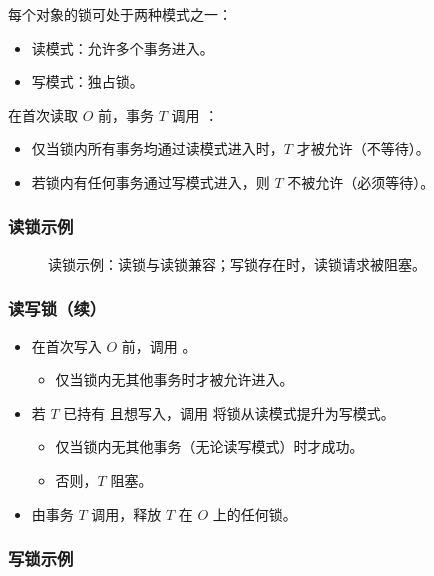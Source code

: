每个对象的锁可处于两种模式之一：

\begin{itemize}
  \item 读模式：允许多个事务进入。
  \item 写模式：独占锁。
\end{itemize}

在首次读取 $O$ 前，事务 $T$ 调用 ：

\begin{itemize}
  \item 仅当锁内所有事务均通过读模式进入时，$T$ 才被允许（不等待）。
  \item 若锁内有任何事务通过写模式进入，则 $T$ 不被允许（必须等待）。
\end{itemize}

\subsubsection{读锁示例}

\begin{figure}[H]
  \centering
  \caption{读锁示例：读锁与读锁兼容；写锁存在时，读锁请求被阻塞。}
\end{figure}

\subsubsection{读写锁（续）}

\begin{itemize}
  \item 在首次写入 $O$ 前，调用 。
  \begin{itemize}
    \item 仅当锁内无其他事务时才被允许进入。
  \end{itemize}
  \item 若 $T$ 已持有  且想写入，调用  将锁从读模式提升为写模式。
  \begin{itemize}
    \item 仅当锁内无其他事务（无论读写模式）时才成功。
    \item 否则，$T$ 阻塞。
  \end{itemize}
  \item {} 由事务 $T$ 调用，释放 $T$ 在 $O$ 上的任何锁。
\end{itemize}

\subsubsection{写锁示例}

